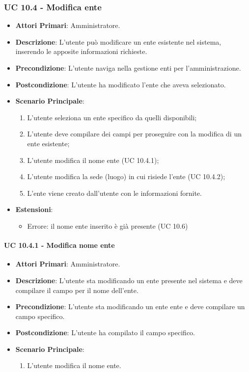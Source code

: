 			\subsubsection{UC 10.4 - Modifica ente}
			\begin{itemize}
				\item \textbf{Attori Primari}: Amministratore.
				\item \textbf{Descrizione}: L'utente può modificare un ente esistente nel sistema, inserendo le apposite informazioni richieste.
				\item \textbf{Precondizione}: L'utente naviga nella gestione enti per l'amministrazione.
				\item \textbf{Postcondizione}: L'utente ha modificato l'ente che aveva selezionato.
				\item \textbf{Scenario Principale}:
				\begin{enumerate}
					\item L'utente seleziona un ente specifico da quelli disponibili;
					\item{L'utente deve compilare dei campi per proseguire con la modifica di un ente esistente;}
					\item L'utente modifica il nome ente (UC 10.4.1);
					\item L'utente modifica la sede (luogo) in cui risiede l'ente (UC 10.4.2);
					\item{L'ente viene creato dall'utente con le informazioni fornite.}
				\end{enumerate}	
				\item \textbf{Estensioni}:
					\begin{itemize}
						\item Errore: il nome ente inserito è già presente (UC 10.6)
					\end{itemize}
			\end{itemize}	

				\paragraph{UC 10.4.1 - Modifica nome ente}
				\begin{itemize}
					\item \textbf{Attori Primari}: Amministratore.
					\item \textbf{Descrizione}: L'utente sta modificando un ente presente nel sistema e deve compilare il campo per il nome dell'ente.
					\item \textbf{Precondizione}: L'utente sta modificando un ente ente e deve compilare un campo specifico.
					\item \textbf{Postcondizione}: L'utente ha compilato il campo specifico.
					\item \textbf{Scenario Principale}:
					\begin{enumerate}
						\item L'utente modifica il nome ente.
					\end{enumerate}	
				\end{itemize}	

